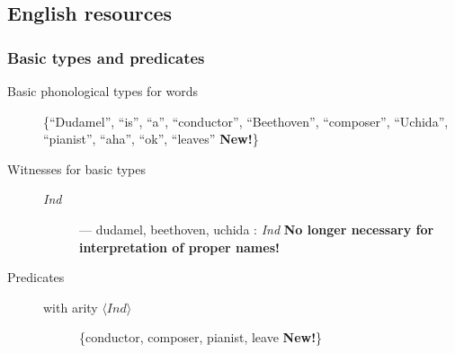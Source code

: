   



\subsection{English resources} 

\subsubsection{Basic types and predicates} 

\begin{description}

  
\item[Basic phonological  types for words] \mbox{}

  \{``Dudamel'', ``is'', ``a'', ``conductor'', ``Beethoven'',
  ``composer'', ``Uchida'', ``pianist'', ``aha'', ``ok'', ``leaves'' \textbf{New!}\}

\item [Witnesses for basic types] \mbox{}

  \begin{description}
\item[\textnormal{\textit{Ind}}] --- dudamel, beethoven, uchida :
  \textit{Ind} \textbf{No longer necessary for interpretation of
    proper names!}
  \end{description}

  
\item[Predicates] \mbox{}
  
  \begin{description}
  
  \item[with arity \textnormal{$\langle\textit{Ind}\rangle$}]
    \{conductor, composer, pianist, leave \textbf{New!}\}
  \end{description}
  

\end{description}

